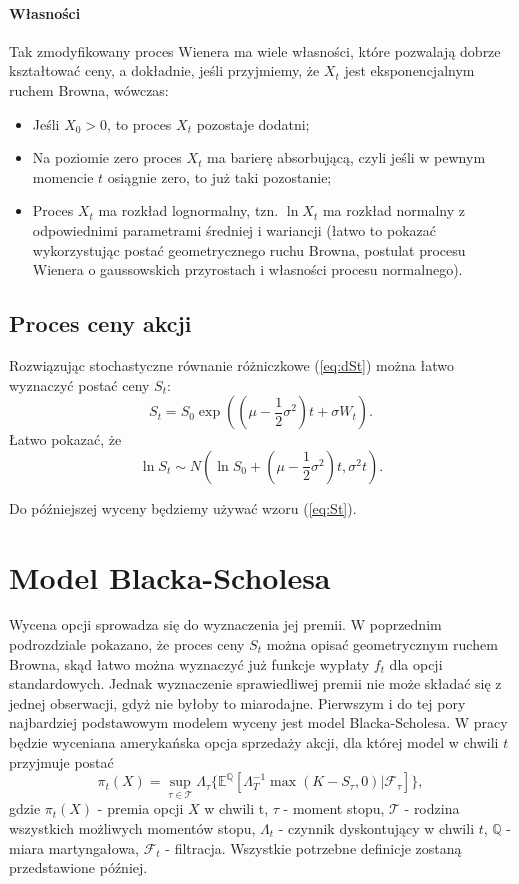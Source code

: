 \documentclass[]{pwr_wmat_praca_dyplomowa}
\theoremstyle{plain}
\numberwithin{theorem}{chapter}
\theoremstyle{definition}
\numberwithin{theorem}{chapter}
\begin{document}
\paragraph{Własności} Tak zmodyfikowany proces Wienera ma wiele własności, które pozwalają dobrze kształtować ceny, a dokładnie, jeśli przyjmiemy, że $X_t$ jest eksponencjalnym ruchem Browna, wówczas:
\begin{itemize}
\item Jeśli $X_0 > 0$, to proces $X_t$ pozostaje dodatni;
\item Na poziomie zero proces $X_t$ ma barierę absorbującą, czyli jeśli w pewnym momencie $t$ osiągnie zero, to już taki pozostanie;
\item Proces $X_t$ ma rozkład lognormalny, tzn. $\ln X_t$ ma rozkład normalny z odpowiednimi parametrami średniej i wariancji (łatwo to pokazać wykorzystując postać geometrycznego ruchu Browna, postulat procesu Wienera o gaussowskich przyrostach i własności procesu normalnego).
\end{itemize}

\subsection{Proces ceny akcji}

Rozwiązując stochastyczne równanie różniczkowe (\ref{eq:dSt}) można łatwo wyznaczyć postać ceny $S_t$:
\begin{equation}
\label{eq:St}
S_t = S_0 \exp((\mu - \frac{1}{2}\sigma^2)t + \sigma W_t).
\end{equation}
Łatwo pokazać, że 
\begin{equation}
\label{eq:rozklad}
\ln S_t \sim N(\ln S_0 + (\mu-\frac{1}{2}\sigma^2)t, \sigma^2 t).
\end{equation}

\noindent Do późniejszej wyceny będziemy używać wzoru (\ref{eq:St}).

\section{Model Blacka-Scholesa}
Wycena opcji sprowadza się do wyznaczenia jej premii. W poprzednim podrozdziale pokazano, że proces ceny $S_t$ można opisać geometrycznym ruchem Browna, skąd łatwo można wyznaczyć już funkcje wypłaty $f_t$ dla opcji standardowych. Jednak wyznaczenie sprawiedliwej premii nie może składać się z jednej obserwacji, gdyż nie byłoby to miarodajne. Pierwszym i do tej pory najbardziej podstawowym modelem wyceny jest model Blacka-Scholesa. W pracy będzie wyceniana amerykańska opcja sprzedaży akcji, dla której model w chwili $t$ przyjmuje postać
\begin{equation}
\label{eq:B-S}
\pi_t(X) = \sup_{\tau \in \mathcal{T}} \Lambda_{\tau}\{\mathbb{E}^{\mathbb{Q}}[\Lambda_{T}^{-1}\max(K-S_{\tau},0)|\mathcal{F}_{\tau}]\},
\end{equation}
gdzie $\pi_t(X)$ - premia opcji $X$ w chwili t, $\tau$ - moment stopu, $\mathcal{T}$ - rodzina wszystkich możliwych momentów stopu, $\Lambda_t$ - czynnik dyskontujący w chwili $t$, $\mathbb{Q}$ - miara martyngałowa, $\mathcal{F}_t$ - filtracja. Wszystkie potrzebne definicje zostaną przedstawione później.
\end{document}
